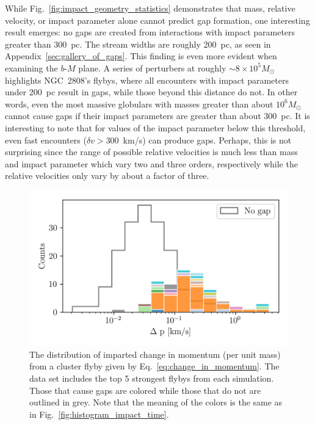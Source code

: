 \documentclass[draft]{aa}
\begin{document}
      
  
    While Fig.~\ref{fig:impact_geometry_statistics} demonstrates that mass, relative velocity, or impact parameter alone cannot predict gap formation, one interesting result emerges: no gaps are created from interactions with impact parameters greater than 300~pc. The stream widths are roughly 200~pc, as seen in Appendix~\ref{sec:gallery_of_gaps}. This finding is even more evident when examining the $b$-$M$ plane. A series of perturbers at roughly $\sim8 \times 10^5 M_\odot$ highlights NGC~2808's flybys, where all encounters with impact parameters under 200~pc result in gaps, while those beyond this distance do not. In other words, even the most massive globulars with masses greater than about $10^6 M_\odot$ cannot cause gaps if their impact parameters are greater than about $300$~pc. It is interesting to note that for values of the impact parameter below this threshold, even fast encounters ($\delta v > 300$~km/s) can produce gaps. Perhaps, this is not surprising since the range of possible relative velocities is much less than mass and impact parameter which vary two and three orders, respectively while the relative velocities only vary by about a factor of three.

    \begin{figure}
      \centering
      \includegraphics[width=1\linewidth]{impact_geometry_statistics_deltaP.png}
      \caption{The distribution of imparted change in momentum (per unit mass) from a cluster flyby given by Eq.~\ref{eq:change_in_momentum}. The data set includes the top 5 strongest flybys from each simulation. Those that cause gaps are colored while those that do not are outlined in grey. Note that the meaning of the colors is the same as in Fig.~\ref{fig:histogram_impact_time}.}
      \label{fig:deltap}
    \end{figure}
      
\end{document}
